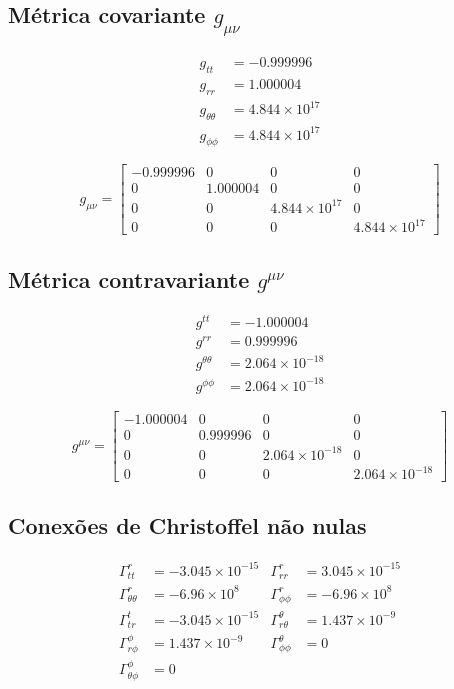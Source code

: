 \documentclass[12pt,a4paper]{article}
\begin{document}
\subsection*{Métrica covariante $g_{\mu\nu}$}
\begin{align*}
g_{tt} &= -0.999996\\
g_{rr} &= 1.000004\\
g_{\theta\theta} &= 4.844\times10^{17}\\
g_{\phi\phi} &= 4.844\times10^{17}
\end{align*}

\[
g_{\mu\nu} =
\begin{bmatrix}
-0.999996 & 0 & 0 & 0 \\
0 & 1.000004 & 0 & 0 \\
0 & 0 & 4.844\times10^{17} & 0 \\
0 & 0 & 0 & 4.844\times10^{17}
\end{bmatrix}
\]

\subsection*{Métrica contravariante $g^{\mu\nu}$}
\begin{align*}
g^{tt} &= -1.000004\\
g^{rr} &= 0.999996\\
g^{\theta\theta} &= 2.064\times10^{-18}\\
g^{\phi\phi} &= 2.064\times10^{-18}
\end{align*}

\[
g^{\mu\nu} =
\begin{bmatrix}
-1.000004 & 0 & 0 & 0 \\
0 & 0.999996 & 0 & 0 \\
0 & 0 & 2.064\times10^{-18} & 0 \\
0 & 0 & 0 & 2.064\times10^{-18}
\end{bmatrix}
\]

\subsection*{Conexões de Christoffel não nulas}
\begin{align*}
\Gamma^r_{tt} &= -3.045\times10^{-15} &
\Gamma^r_{rr} &= 3.045\times10^{-15} \\
\Gamma^r_{\theta\theta} &= -6.96\times10^8 &
\Gamma^r_{\phi\phi} &= -6.96\times10^8 \\
\Gamma^t_{tr} &= -3.045\times10^{-15} &
\Gamma^\theta_{r\theta} &= 1.437\times10^{-9} \\
\Gamma^\phi_{r\phi} &= 1.437\times10^{-9} &
\Gamma^\theta_{\phi\phi} &= 0 \\
\Gamma^\phi_{\theta\phi} &= 0
\end{align*}
\end{document}
